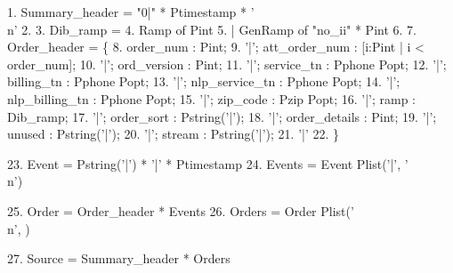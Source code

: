 \begin{code}
 1.  Summary\_header = "0|" * Ptimestamp * '\\n'
 2. \mbox{}
 3.  Dib\_ramp = 
 4.   Ramp of Pint 
 5. | GenRamp of "no\_ii" * Pint
 6. \mbox{}
 7.  Order\_header = \{ 
 8.      order\_num : Pint;  
 9. '|'; att\_order\_num : [i:Pint | i < order\_num];  
10. '|'; ord\_version : Pint;  
11. '|'; service\_tn : Pphone Popt;
12. '|'; billing\_tn : Pphone Popt;  
13. '|'; nlp\_service\_tn : Pphone Popt;  
14. '|'; nlp\_billing\_tn : Pphone Popt;  
15. '|'; zip\_code : Pzip Popt;  
16. '|'; ramp : Dib\_ramp;  
17. '|'; order\_sort : Pstring('|');  
18. '|'; order\_details : Pint;
19. '|'; unused : Pstring('|');  
20. '|'; stream : Pstring('|'); 
21. '|'
22. \} 

23.  Event  = Pstring('|') * '|' * Ptimestamp
24.  Events = Event Plist('|', '\\n')

25.  Order  = Order\_header * Events
26.  Orders = Order Plist('\\n', )

27.  Source = Summary\_header * Orders\end{code}
